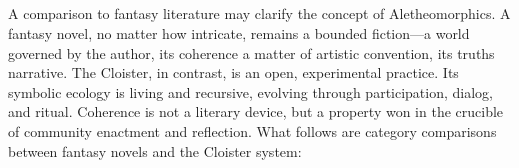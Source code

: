 \subsection*{}

A comparison to fantasy literature may clarify the concept of Aletheomorphics.
A fantasy novel, no matter how intricate, remains a bounded fiction—a world
governed by the author, its coherence a matter of artistic convention, its
truths narrative. The Cloister, in contrast, is an open, experimental practice.
Its symbolic ecology is living and recursive, evolving through participation,
dialog, and ritual. Coherence is not a literary device, but a property won in
the crucible of community enactment and reflection.  What follows are category
comparisons between fantasy novels and the Cloister system:


